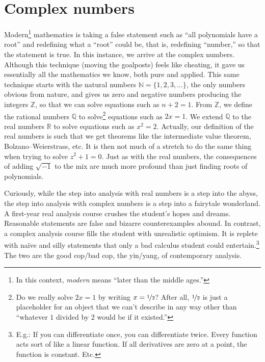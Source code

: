 \documentclass[12pt,openany]{book}
\newcommand{\glsadd}[2][]{}
\newcommand{\R}{{\mathbb{R}}}
\newcommand{\Z}{{\mathbb{Z}}}
\newcommand{\N}{{\mathbb{N}}}
\newcommand{\Q}{{\mathbb{Q}}}
\newcommand{\myquote}[1]{``#1''}
\theoremstyle{plain}
\theoremstyle{remark}
\theoremstyle{definition}
\theoremstyle{exercise}
\theoremstyle{example}
\begin{document}
\section{Complex numbers} \label{sec:complexnums}

Modern\footnote{In this context, \emph{modern}
means \myquote{later than the middle ages.}}
mathematics
is taking a false statement such as
\myquote{all polynomials have a root} and redefining what a
\myquote{root} could be, that is,
redefining \myquote{number,}
so that the statement is true.
In this instance, we arrive at the complex numbers.
Although this technique (moving the goalposts)
feels like cheating, it gave us
essentially all the mathematics we know, both pure and applied.
This same
technique starts with the natural numbers
\glsadd{not:N}$\N = \{ 1,2,3,\ldots \}$, the only
numbers obvious from nature,
and gives us zero and negative numbers producing the integers
\glsadd{not:Z}$\Z$, so that we can solve equations such as $n+2 = 1$.
From \glsadd{not:Z}$\Z$, we define the rational numbers
\glsadd{not:Q}$\Q$ to solve\footnote{%
Do we really solve $2x=1$ by writing $x = \nicefrac{1}{2}$?  After all, 
$\nicefrac{1}{2}$ is just a placeholder for an object that we can't describe
in any way other than
\myquote{whatever $1$ divided by $2$ would be if it existed.}}
equations such as $2x=1$.  We extend
$\Q$ to the real numbers \glsadd{not:R}$\R$
to solve equations such as $x^2=2$.  Actually, our definition 
of the real numbers is such that we get theorems like the
intermediate value theorem, Bolzano--Weierstrass,
etc.  It is then not much of a stretch to do the same thing when trying
to solve $z^2+1=0$.  Just as with the real numbers,
the consequences of adding $\sqrt{-1}$ to the mix are much more
profound than just finding roots of polynomials.

Curiously, while the step into analysis with real numbers
is a step into the abyss, the step into analysis with complex numbers is a
step into a fairytale wonderland.  A first-year real analysis course
crushes the student's hopes and dreams.  Reasonable statements
are false and bizarre counterexamples abound.
In contrast, a complex analysis course fills the student with
unrealistic optimism.  It is replete with na\"ive and silly statements
that only a bad calculus student could entertain.\footnote{%
E.g.:  If you can differentiate once, you can differentiate twice.
Every function acts sort of like a linear function.
If all derivatives are zero at a point, the function is constant.
Etc.}
The two are the good cop/bad cop, the yin/yang,
of contemporary analysis.
\end{document}
